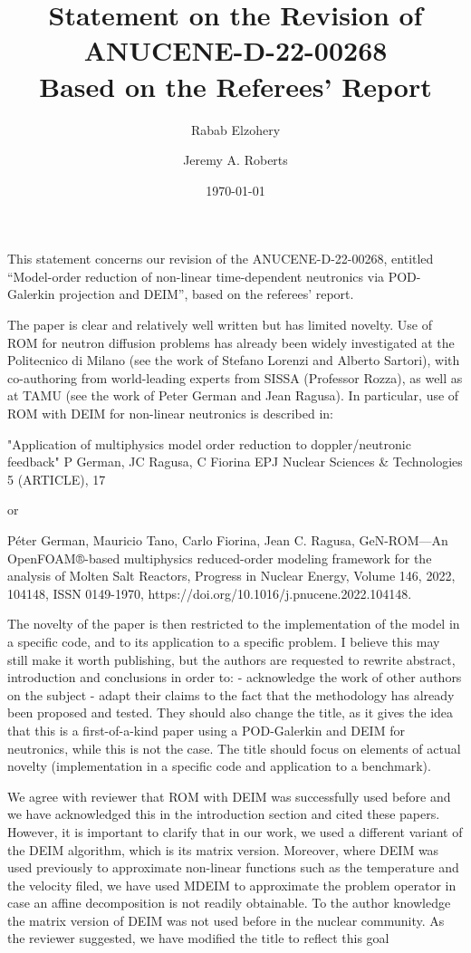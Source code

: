 \documentclass[10pt]{article}
\title{Statement on the Revision of ANUCENE-D-22-00268 \\
  Based on the Referees' Report}
\author{Rabab Elzohery \and Jeremy A. Roberts}
\date{\today}
\begin{document}
This statement concerns our revision of the ANUCENE-D-22-00268, entitled ``Model-order reduction of non-linear time-dependent neutronics via POD-Galerkin projection and DEIM'', based on the referees' report.


\begin{response}{
   The paper is clear and relatively well written but has limited novelty. Use of ROM for neutron diffusion problems has already been widely investigated at the Politecnico di Milano (see the work of Stefano Lorenzi and Alberto Sartori), with co-authoring from world-leading experts from SISSA (Professor Rozza), as well as at TAMU (see the work of Peter German and Jean Ragusa). In particular, use of ROM with DEIM for non-linear neutronics is described in:
  
  "Application of multiphysics model order reduction to doppler/neutronic feedback"
  P German, JC Ragusa, C Fiorina
  EPJ Nuclear Sciences \& Technologies 5 (ARTICLE), 17
  
  or
  
  Péter German, Mauricio Tano, Carlo Fiorina, Jean C. Ragusa,
  GeN-ROM—An OpenFOAM®-based multiphysics reduced-order modeling framework for the analysis of Molten Salt Reactors,
  Progress in Nuclear Energy,
  Volume 146,
  2022,
  104148,
  ISSN 0149-1970,
  https://doi.org/10.1016/j.pnucene.2022.104148.
  
  The novelty of the paper is then restricted to the implementation of the model in a specific code, and to its application to a specific problem. I believe this may still make it worth publishing, but the authors are requested to rewrite abstract, introduction and conclusions in order to:
  - acknowledge the work of other authors on the subject
  - adapt their claims to the fact that the methodology has already been proposed and tested.
  They should also change the title, as it gives the idea that this is a first-of-a-kind paper using a POD-Galerkin and DEIM for neutronics, while this is not the case. The title should focus on elements of actual novelty (implementation in a specific code and application to a benchmark).}

We agree with reviewer that ROM with DEIM was successfully used before and we have acknowledged this in the introduction section and cited these papers.
However, it is important to clarify that in our work, we used a different variant of the DEIM algorithm, which is its matrix version.
Moreover, where DEIM was used previously to approximate non-linear functions such as the temperature and the velocity filed, we have used MDEIM to approximate the problem operator in case an affine decomposition is not readily obtainable. To the author knowledge the matrix version of DEIM was not used before in the nuclear community.
As the reviewer suggested, we have modified the title to reflect this goal
\end{response}
\end{document}
